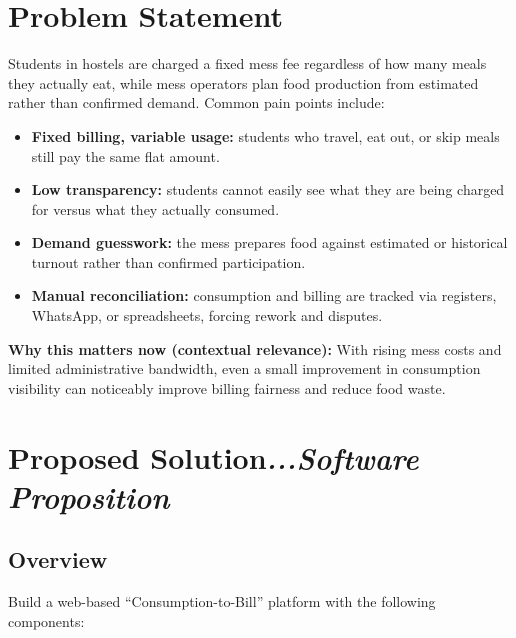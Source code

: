 \documentclass[12pt,a4paper]{article}
\newcommand{\secann}[1]{\hfill\normalfont\itshape #1}
\begin{document}
\section{Problem Statement}

Students in hostels are charged a fixed mess fee regardless of how many meals
they actually eat, while mess operators plan food production from estimated
rather than confirmed demand. Common pain points include:

\begin{itemize}
    \item \textbf{Fixed billing, variable usage:} students who travel, eat
    out, or skip meals still pay the same flat amount.
    \item \textbf{Low transparency:} students cannot easily see what they are
    being charged for versus what they actually consumed.
    \item \textbf{Demand guesswork:} the mess prepares food against estimated
    or historical turnout rather than confirmed participation.
    \item \textbf{Manual reconciliation:} consumption and billing are tracked
    via registers, WhatsApp, or spreadsheets, forcing rework and disputes.
\end{itemize}

\textbf{Why this matters now (contextual relevance):} With rising mess costs
and limited administrative bandwidth, even a small improvement in consumption
visibility can noticeably improve billing fairness and reduce food waste.

\section{Proposed Solution\secann{...Software Proposition}}

\subsection{Overview}

Build a web-based ``Consumption-to-Bill'' platform with the following
components:
\end{document}
